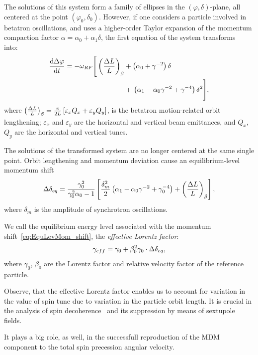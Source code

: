 \documentclass[]{elsarticle}
\newcommand{\w}{\omega}
\newcommand{\D}{\Delta}
\begin{document}
The solutions of this system form a family of ellipses in the $(\varphi, \delta)$-plane, all centered at the
point $(\varphi_0,\delta_0)$. However, if one considers a particle involved in betatron oscillations, and
uses a higher-order Taylor expansion of the momentum compaction factor
$\alpha = \alpha_0 + \alpha_1\delta$, the first equation of the system
transforms into:~\cite[p.~2579]{Senichev:IPAC13}
\begin{align*}
  \ddt{\D\varphi} = -\w_{RF} \Bigg[\bkt{\frac{\Delta L}{L}}_\beta &+ \bkt{\alpha_0 + \gamma^{-2}}\delta \Bigg.\\
                                                                  &+ \Bigg.\bkt{\alpha_1 - \alpha_0\gamma^{-2} + \gamma^{-4}}\delta^2\Bigg],
\end{align*}
where $\bkt{\frac{\Delta L}{L}}_\beta = \frac{\pi}{2L}\bkt*{\varepsilon_xQ_x + \varepsilon_yQ_y}$, is
the betatron motion-related orbit lengthening; $\varepsilon_x$ and $\varepsilon_y$ are
the horizontal and vertical beam emittances, and $Q_x$, $Q_y$ are the horizontal and vertical tunes.

The solutions of the transformed system are no longer centered at the same single point. Orbit lengthening
and momentum deviation cause an equilibrium-level momentum shift~\cite[p.~2581]{Senichev:IPAC13}
\begin{equation}\label{eq:EquLevMom_shift}
  \Delta\delta_{eq} = \frac{\gamma_0^2}{\gamma_0^2\alpha_0 - 1}\bkt*{\frac{\delta_m^2}{2}\bkt{\alpha_1 - \alpha_0\gamma^{-2} + \gamma_0^{-4}} + \bkt{\frac{\Delta L}{L}}_\beta},
\end{equation}
where $\delta_m$ is the amplitude of synchrotron oscillations.

We call the equilibrium energy level associated with the momentum shift~\eqref{eq:EquLevMom_shift},
the \emph{effective Lorentz factor}:
\begin{equation}\label{eq:EffectiveGamma}
  \g*= \gamma_0 + \beta_0^2\gamma_0\cdot\Delta\delta_{eq},
\end{equation}
where $\gamma_0$, $\beta_0$ are the Lorentz factor and relative velocity factor of the reference particle.

Observe, that the effective Lorentz factor enables us to account for variation in the value of spin tune
due to variation in the particle orbit length. It is crucial in the analysis of
spin decoherence~\cite{Aksentev:IPAC19:Decoh} and its suppression by means of sextupole fields.

It plays a big role, as well, in the successfull reproduction of the MDM component to the total spin precession
angular velocity.
\end{document}
